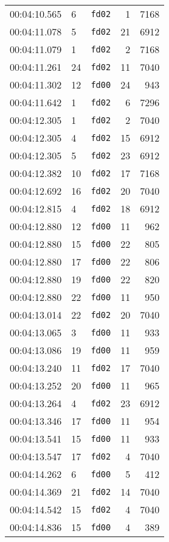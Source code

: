 \documentclass{article}
\begin{document}
\begin{longtable}{lllrr}
00:04:10.565 & 6 & \texttt{fd02} & 1 & 7168 \\
00:04:11.078 & 5 & \texttt{fd02} & 21 & 6912 \\
00:04:11.079 & 1 & \texttt{fd02} & 2 & 7168 \\
00:04:11.261 & 24 & \texttt{fd02} & 11 & 7040 \\
00:04:11.302 & 12 & \texttt{fd00} & 24 & 943 \\
00:04:11.642 & 1 & \texttt{fd02} & 6 & 7296 \\
00:04:12.305 & 1 & \texttt{fd02} & 2 & 7040 \\
00:04:12.305 & 4 & \texttt{fd02} & 15 & 6912 \\
00:04:12.305 & 5 & \texttt{fd02} & 23 & 6912 \\
00:04:12.382 & 10 & \texttt{fd02} & 17 & 7168 \\
00:04:12.692 & 16 & \texttt{fd02} & 20 & 7040 \\
00:04:12.815 & 4 & \texttt{fd02} & 18 & 6912 \\
00:04:12.880 & 12 & \texttt{fd00} & 11 & 962 \\
00:04:12.880 & 15 & \texttt{fd00} & 22 & 805 \\
00:04:12.880 & 17 & \texttt{fd00} & 22 & 806 \\
00:04:12.880 & 19 & \texttt{fd00} & 22 & 820 \\
00:04:12.880 & 22 & \texttt{fd00} & 11 & 950 \\
00:04:13.014 & 22 & \texttt{fd02} & 20 & 7040 \\
00:04:13.065 & 3 & \texttt{fd00} & 11 & 933 \\
00:04:13.086 & 19 & \texttt{fd00} & 11 & 959 \\
00:04:13.240 & 11 & \texttt{fd02} & 17 & 7040 \\
00:04:13.252 & 20 & \texttt{fd00} & 11 & 965 \\
00:04:13.264 & 4 & \texttt{fd02} & 23 & 6912 \\
00:04:13.346 & 17 & \texttt{fd00} & 11 & 954 \\
00:04:13.541 & 15 & \texttt{fd00} & 11 & 933 \\
00:04:13.547 & 17 & \texttt{fd02} & 4 & 7040 \\
00:04:14.262 & 6 & \texttt{fd00} & 5 & 412 \\
00:04:14.369 & 21 & \texttt{fd02} & 14 & 7040 \\
00:04:14.542 & 15 & \texttt{fd02} & 4 & 7040 \\
00:04:14.836 & 15 & \texttt{fd00} & 4 & 389 \\

\end{longtable}
\end{document}
